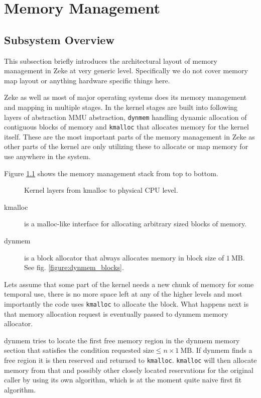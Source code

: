 \part{Memory Management}

\chapter{Subsystem Overview}

This subsection briefly introduces the architectural layout of memory management
in Zeke at very generic level. Specifically we do not cover memory map layout or
anything hardware specific things here.

Zeke as well as most of major operating systems does its memory management and
mapping in multiple stages. In the kernel stages are built into following layers
of abstraction \ac{MMU} abstraction, \verb+dynmem+ handling dynamic allocation
of contiguous blocks of memory and \verb+kmalloc+ that allocates memory for the
kernel itself. These are the most important parts of the memory management in
Zeke as other parts of the kernel are only utilizing these to allocate or map
memory for use anywhere in the system.

Figure \ref{figure:mm_layers} shows the memory management stack from
top to bottom.

\begin{figure}
  
  \centering
  \caption{Kernel layers from kmalloc to physical \acs{CPU} level.}
  \label{figure:mm_layers}
\end{figure}

\begin{description}
\item[kmalloc] is a malloc-like interface for allocating arbitrary sized blocks
  of memory.
\item[dynmem] is a block allocator that always allocates memory in block size of
  $1 \:\textrm{MB}$. See fig. \ref{figure:dynmem_blocks}.
\end{description}

Lets assume that some part of the kernel needs a new chunk of memory for some
temporal use, there is no more space left at any of the higher levels and most
importantly the code uses \verb+kmalloc+ to allocate the block. What happens
next is that memory allocation request is eventually passed to dynmem memory
allocator.

dynmem tries to locate the first free memory region in the dynmem memory section
that satisfies the condition
$\textrm{requested size} \le n \times 1 \:\textrm{MB}$. If dynmem finds a free
region it is then reserved and returned to \verb+kmalloc+. \verb+kmalloc+ will
then allocate memory from that and possibly other closely located reservations
for the original caller by using its own algorithm, which is at the moment quite
naive first fit algorithm.

